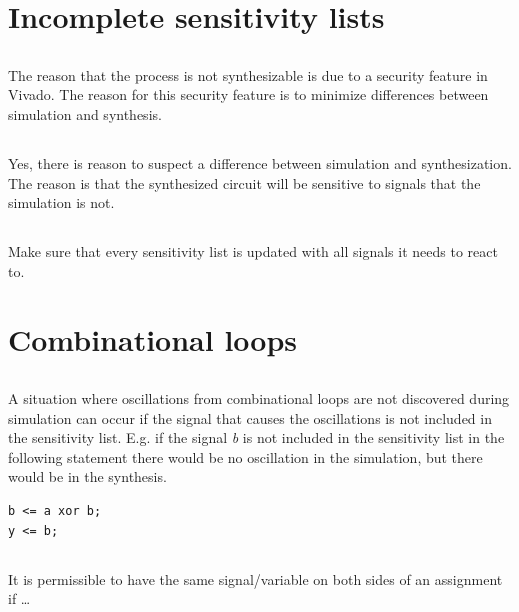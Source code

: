 \documentclass{article}
\begin{document}
\section{Incomplete sensitivity lists}
\subsection{}
The reason that the process is not synthesizable is due to a security
feature in Vivado. The reason for this security feature is to minimize
differences between simulation and synthesis.

\subsection{}
Yes, there is reason to suspect a difference between simulation and
synthesization. The reason is that the synthesized circuit will be
sensitive to signals that the simulation is not.

\subsection{}
Make sure that every sensitivity list is updated with all signals it
needs to react to.

\section{Combinational loops}
\subsection{}
A situation where oscillations from combinational loops are not
discovered during simulation can occur if the signal that causes the
oscillations is not included in the sensitivity list. E.g. if the
signal \emph{b} is not included in the sensitivity list in the
following statement there would be no oscillation in the simulation,
but there would be in the synthesis.

\begin{lstlisting}
b <= a xor b;
y <= b;
\end{lstlisting}

\subsection{}
It is permissible to have the same signal/variable on both sides of an
assignment if \ldots
\end{document}
